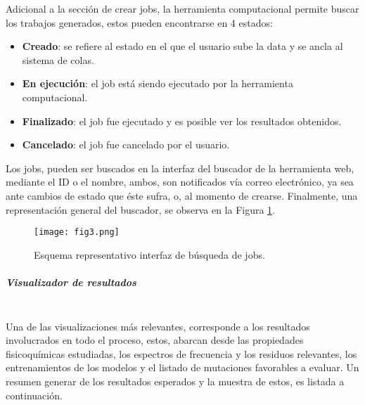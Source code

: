 Adicional a la sección de crear jobs, la herramienta computacional permite buscar los trabajos generados, estos pueden encontrarse en 4 estados:

\begin{itemize}
	
	\item \textbf{Creado}: se refiere al estado en el que el usuario sube la data y se ancla al sistema de colas.
	\item \textbf{En ejecución}: el job está siendo ejecutado por la herramienta computacional. 
	\item \textbf{Finalizado}: el job fue ejecutado y es posible ver los resultados obtenidos.
	\item \textbf{Cancelado}: el job fue cancelado por el usuario.
\end{itemize}

Los jobs, pueden ser buscados en la interfaz del buscador de la herramienta web, mediante el ID o el nombre, ambos, son notificados vía correo electrónico, ya sea ante cambios de estado que éste sufra, o, al momento de crearse. Finalmente, una representación general del buscador, se observa en la Figura \ref{cap4:fig3}.

\begin{figure}[!h]
	
	\centering
	\texttt{[image: fig3.png]}
	\caption{Esquema representativo interfaz de búsqueda de jobs.}
	\label{cap4:fig3}
\end{figure}

\subparagraph{Visualizador de resultados\\\\}

Una de las visualizaciones más relevantes, corresponde a los resultados involucrados en todo el proceso, estos, abarcan desde las propiedades fisicoquímicas estudiadas, los espectros de frecuencia y los residuos relevantes, los entrenamientos de los modelos y el listado de mutaciones favorables a evaluar. Un resumen generar de los resultados esperados y la muestra de estos, es listada a continuación.

